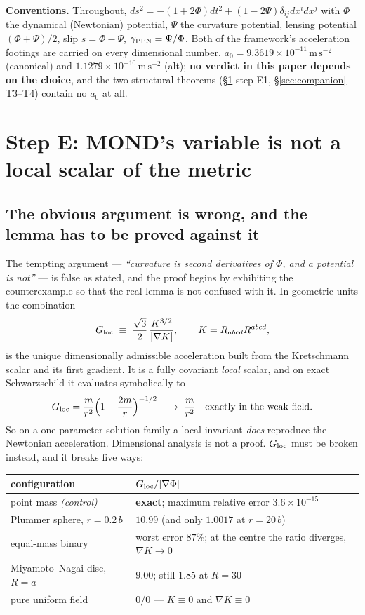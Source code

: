 \documentclass[11pt,letterpaper]{article}
\newcommand{\ms}{\,\mathrm{m\,s^{-2}}}
\begin{document}
\textbf{Conventions.} Throughout, $ds^2=-(1+2\Phi)dt^2+(1-2\Psi)\delta_{ij}dx^idx^j$ with $\Phi$ the dynamical (Newtonian) potential, $\Psi$ the curvature potential, lensing potential $(\Phi+\Psi)/2$, slip $s=\Phi-\Psi$, $\gamma_{\rm PPN}=\Psi/\Phi$. Both of the framework's acceleration footings are carried on every dimensional number, $a_0=9.3619\times10^{-11}\ms$ (canonical) and $1.1279\times10^{-10}\ms$ (alt); \textbf{no verdict in this paper depends on the choice}, and the two structural theorems (\S\ref{sec:E} step E1, \S\ref{sec:companion} T3--T4) contain no $a_0$ at all.

\section{Step E: MOND's variable is not a local scalar of the metric}\label{sec:E}

\subsection{The obvious argument is wrong, and the lemma has to be proved against it}
The tempting argument --- \emph{``curvature is second derivatives of $\Phi$, and a potential is not''} --- is false as stated, and the proof begins by exhibiting the counterexample so that the real lemma is not confused with it. In geometric units the combination
\begin{equation}
G_{\rm loc}\;\equiv\;\frac{\sqrt3}{2}\,\frac{K^{3/2}}{|\nabla K|},\qquad K=R_{abcd}R^{abcd},
\end{equation}
is the unique dimensionally admissible acceleration built from the Kretschmann scalar and its first gradient. It is a fully covariant \emph{local} scalar, and on exact Schwarzschild it evaluates symbolically to
\begin{equation}
G_{\rm loc}=\frac{m}{r^2}\Big(1-\frac{2m}{r}\Big)^{-1/2}\;\longrightarrow\;\frac{m}{r^2}\quad\text{exactly in the weak field.}
\end{equation}
So on a one-parameter solution family a local invariant \emph{does} reproduce the Newtonian acceleration. Dimensional analysis is not a proof. $G_{\rm loc}$ must be broken instead, and it breaks five ways:

\begin{center}\small
\begin{tabular}{L{0.42\textwidth}L{0.46\textwidth}}\toprule
configuration & $G_{\rm loc}/|\nabla\Phi|$ \\\midrule
point mass \emph{(control)} & \textbf{exact}; maximum relative error $3.6\times10^{-15}$\\
Plummer sphere, $r=0.2\,b$ & $10.99$ (and only $1.0017$ at $r=20\,b$)\\
equal-mass binary & worst error \textbf{$87\%$}; at the centre the ratio diverges, $\nabla K\to0$\\
Miyamoto--Nagai disc, $R=a$ & $9.00$; still $1.85$ at $R=30$\\
pure uniform field & \textbf{$0/0$} --- $K\equiv0$ and $\nabla K\equiv0$\\\bottomrule
\end{tabular}
\end{center}
\end{document}
